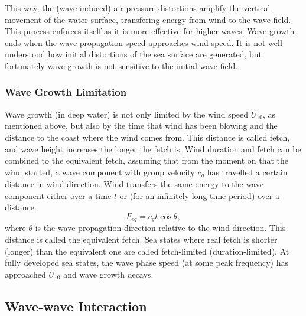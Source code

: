 This way, the (wave-induced) air pressure distortions amplify the vertical 
movement of the water surface, transfering energy from wind to the wave field. 
This process enforces itself as it is more effective for higher waves. Wave 
growth ends when the wave propagation speed approaches wind speed. It is not 
well understood how initial distortions of the sea surface are generated, but 
fortunately wave growth is not sensitive to the initial wave field.

\subsubsection{Wave Growth Limitation}

Wave growth (in deep water) is not only limited by the wind speed 
$U_{10}$, as mentioned above, but also by the time that wind has been blowing 
and the distance to the coast where the wind comes from. This distance is 
called fetch, and wave height increases the longer the fetch is. Wind duration 
and fetch can be combined to the equivalent fetch, assuming that from the 
moment on that the wind started, a wave component with group velocity $c_g$ has 
travelled a certain distance in wind direction. Wind transfers the same 
energy to the wave component either over a time $t$ or (for an infinitely long 
time period) over a distance
\begin{equation}
 \label{eqFetch}
 F_{eq} = c_g t \cos \theta , 
\end{equation}
where $\theta$ is the wave propagation direction relative to the wind 
direction. This distance is called the equivalent fetch. Sea states where real 
fetch is shorter (longer) than the equivalent one are called fetch-limited 
(duration-limited). At fully developed sea states, the wave phase speed (at 
some peak frequency) has approached $U_{10}$ and wave growth decays.

\subsection{Wave-wave Interaction}

